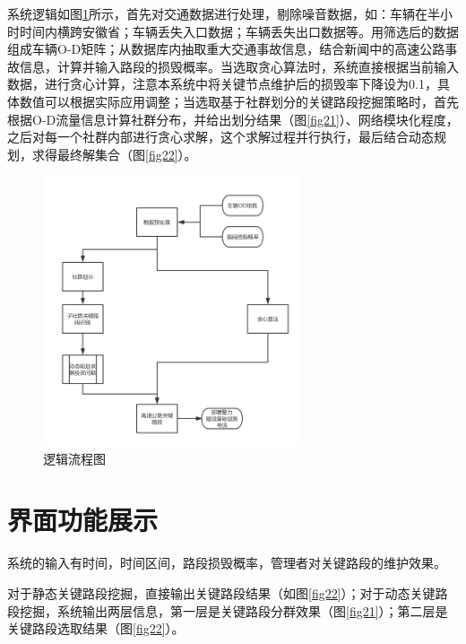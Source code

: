 		系统逻辑如图\ref{fig30}所示，首先对交通数据进行处理，剔除噪音数据，如：车辆在半小时时间内横跨安徽省；车辆丢失入口数据；车辆丢失出口数据等。用筛选后的数据组成车辆O-D矩阵；从数据库内抽取重大交通事故信息，结合新闻中的高速公路事故信息，计算并输入路段的损毁概率。当选取贪心算法时，系统直接根据当前输入数据，进行贪心计算，注意本系统中将关键节点维护后的损毁率下降设为0.1，具体数值可以根据实际应用调整；当选取基于社群划分的关键路段挖掘策略时，首先根据O-D流量信息计算社群分布，并给出划分结果（图\ref{fig21}）、网络模块化程度，之后对每一个社群内部进行贪心求解，这个求解过程并行执行，最后结合动态规划，求得最终解集合（图\ref{fig22}）。
		\begin{figure}
		\centering
				\begin{minipage}{0.8\linewidth}
					\centering
					\includegraphics[width=3in]{picture/liuchengtu}
					\caption{逻辑流程图}
					\label{fig30}
				\end{minipage}%
		\end{figure}


	\section{界面功能展示}

		系统的输入有时间，时间区间，路段损毁概率，管理者对关键路段的维护效果。

		对于静态关键路段挖掘，直接输出关键路段结果（如图\ref{fig22}）；对于动态关键路段挖掘，系统输出两层信息，第一层是关键路段分群效果（图\ref{fig21}）；第二层是关键路段选取结果（图\ref{fig22}）。

